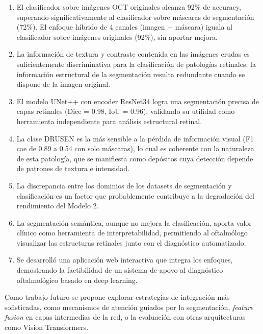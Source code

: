 \documentclass[journal, twocolumn]{IEEEtran}
\begin{document}
\begin{enumerate}
    \item El clasificador sobre imágenes OCT originales alcanza 92\% de accuracy, superando significativamente al clasificador sobre máscaras de segmentación (72\%). El enfoque híbrido de 4 canales (imagen + máscara) iguala al clasificador sobre imágenes originales (92\%), sin aportar mejora.

    \item La información de textura y contraste contenida en las imágenes crudas es suficientemente discriminativa para la clasificación de patologías retinales; la información estructural de la segmentación resulta redundante cuando se dispone de la imagen original.

    \item El modelo UNet++ con encoder ResNet34 logra una segmentación precisa de capas retinales (Dice = 0.98, IoU = 0.96), validando su utilidad como herramienta independiente para análisis estructural retinal.

    \item La clase DRUSEN es la más sensible a la pérdida de información visual (F1 cae de 0.89 a 0.54 con solo máscaras), lo cual es coherente con la naturaleza de esta patología, que se manifiesta como depósitos cuya detección depende de patrones de textura e intensidad.

    \item La discrepancia entre los dominios de los datasets de segmentación y clasificación es un factor que probablemente contribuye a la degradación del rendimiento del Modelo 2.

    \item La segmentación semántica, aunque no mejora la clasificación, aporta valor clínico como herramienta de interpretabilidad, permitiendo al oftalmólogo visualizar las estructuras retinales junto con el diagnóstico automatizado.

    \item Se desarrolló una aplicación web interactiva que integra los enfoques, demostrando la factibilidad de un sistema de apoyo al diagnóstico oftalmológico basado en deep learning.
\end{enumerate}

Como trabajo futuro se propone explorar estrategias de integración más sofisticadas, como mecanismos de atención guiados por la segmentación, \textit{feature fusion} en capas intermedias de la red, o la evaluación con otras arquitecturas como Vision Transformers.



\end{document}
